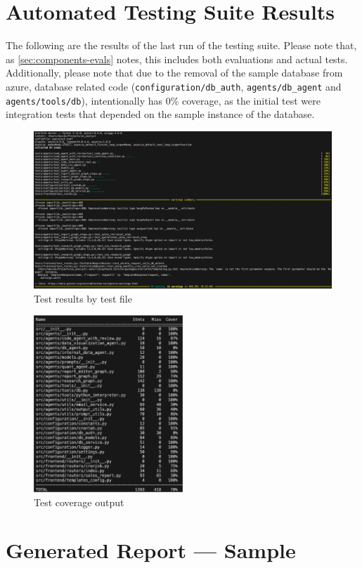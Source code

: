 \documentclass[a4paper]{report}
\begin{document}
\chapter{Automated Testing Suite Results}
\label{annex:test-results}

The following are the results of the last run of the testing suite. Please note that, as \autoref{sec:components-evals} notes, this includes both evaluations and actual tests. Additionally, please note that due to the removal of the sample database from azure, database related code (\texttt{configuration/db\_auth}, \texttt{agents/db\_agent} and \texttt{agents/tools/db}), intentionally has 0\% coverage, as the initial test were integration tests that depended on the sample instance of the database.

\begin{figure}[H]
\centering
\includegraphics[width=1\textwidth]{images/test-results.png}
\caption{Test results by test file}
\end{figure}

\begin{figure}[H]
\centering
\includegraphics[width=0.5\textwidth]{images/test-coverage.png}
\caption{Test coverage output}
\end{figure}

\chapter{Generated Report --- Sample}
\end{document}
